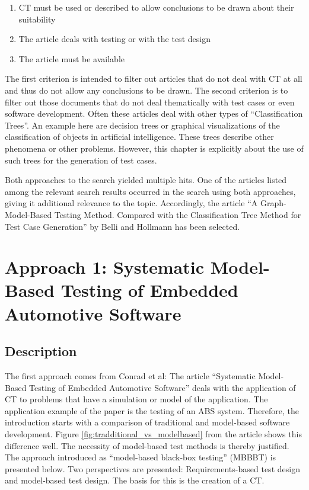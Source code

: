 \begin{enumerate}
\item CT must be used or described to allow conclusions to be drawn about their suitability
\item The article deals with testing or with the test design
\item The article must be available
\end{enumerate}

The first criterion is intended to filter out articles that do not deal with CT at all and thus do not allow any conclusions to be drawn. The second criterion is to filter out those documents that do not deal thematically with test cases or even software development. Often these articles deal with other types of \enquote{Classification Trees}. An example here are decision trees or graphical visualizations of the classification of objects in artificial intelligence. These trees describe other phenomena or  other problems. However, this chapter is explicitly about the use of such trees for the generation of test cases.

Both approaches to the search yielded multiple hits. One of the articles listed among the relevant search results occurred in the search using both approaches, giving it additional relevance to the topic. Accordingly, the article \enquote{A Graph-Model-Based Testing Method. Compared with the Classification Tree Method for Test Case Generation} by Belli and Hollmann\cite{Belli} has been selected.

\pagebreak

\section{Approach 1: Systematic Model-Based Testing of Embedded Automotive Software}
\label{Kap:Approach1}

\subsection{Description}

The first approach comes from Conrad et al\cite{Conrad}: The article \enquote{Systematic Model-Based Testing of Embedded Automotive Software} deals with the application of CT to problems that have a simulation or model of the application. The application example of the paper is the testing of an ABS system. Therefore, the introduction starts with a comparison of traditional and model-based software development. Figure \ref{fig:tradditional_vs_modelbased} from the article shows this difference well. The necessity of model-based test methods is thereby justified. The approach introduced as \enquote{model-based black-box testing} (MBBBT) is presented below. Two perspectives are presented: Requirements-based test design and model-based test design. The basis for this is the creation of a CT.

